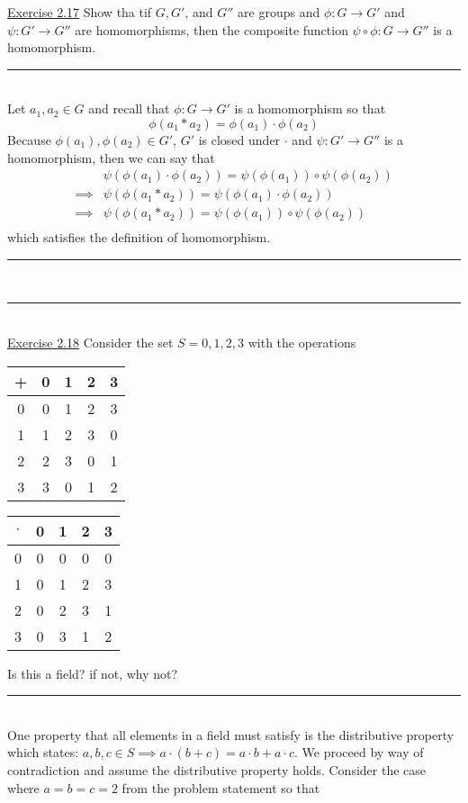 \documentclass{article}
\newcommand{\problemsep}{\leavevmode\\[0.05in] \rule[\baselineskip/4]{\textwidth}{1pt} \\[0.005in] \rule[\baselineskip]{\textwidth}{1pt}\vspace{-\baselineskip}\leavevmode\\[0.05in]}
\newcommand{\statementsep}{\leavevmode\\[0.005in] \rule[\baselineskip/4]{\textwidth}{0.4pt}\leavevmode\\[0.005in]}
\begin{document}
\noindent\underline{Exercise 2.17}
Show tha tif $G, G'$, and $G''$ are groups and $\phi : G\rightarrow G'$ and $\psi : G' \rightarrow G''$ are homomorphisms, then the composite function $\psi \circ \phi : G \rightarrow G''$ is a homomorphism.
\statementsep
Let $a_1,a_2 \in G$ and recall that $\phi : G\rightarrow G'$ is a homomorphism so that
\begin{equation*}
	\phi(a_1*a_2) = \phi(a_1) \cdot \phi(a_2)
\end{equation*}
Because $\phi(a_1), \phi(a_2) \in G'$, $G'$ is closed under $\cdot$ and $\psi: G' \rightarrow G''$ is a homomorphism, then we can say that 
\begin{equation*}\begin{aligned}
& \psi(\phi(a_1)\cdot \phi(a_2)) = \psi(\phi(a_1))\circ \psi(\phi(a_2))  \\
\implies & \psi(\phi(a_1*a_2)) = \psi(\phi(a_1) \cdot \phi(a_2))  \\
\implies & \psi(\phi(a_1*a_2)) = \psi(\phi(a_1)) \circ \psi(\phi(a_2)) \\
\end{aligned}\end{equation*}
which satisfies the definition of homomorphism.
\problemsep
\noindent\underline{Exercise 2.18}
Consider the set $S = {0, 1, 2, 3}$ with the operations \\[0.05in]
\begin{center}
\begin{tabular}{c | c c c c}
+ & 0 & 1 & 2 & 3 \\ \hline
0 & 0 & 1 & 2 & 3 \\
1 & 1 & 2 & 3 & 0 \\
2 & 2 & 3 & 0 & 1 \\
3 & 3 & 0 & 1 & 2 \\
\end{tabular} \hspace{0.2in}
\begin{tabular}{c | c c c c}
$\cdot$ & 0 & 1 & 2 & 3 \\ \hline
0       & 0 & 0 & 0 & 0 \\
1       & 0 & 1 & 2 & 3 \\
2       & 0 & 2 & 3 & 1  \\
3       & 0 & 3 & 1 & 2 \\
\end{tabular} 
\end{center}
Is this a field? if not, why not?
\statementsep
One property that all elements in a field must satisfy is the distributive property which states: $a,b,c \in S \implies a\cdot(b + c) = a\cdot b + a\cdot c$. We proceed by way of contradiction and assume the distributive property holds. Consider the case where $a = b = c = 2$ from the problem statement so that
\end{document}
